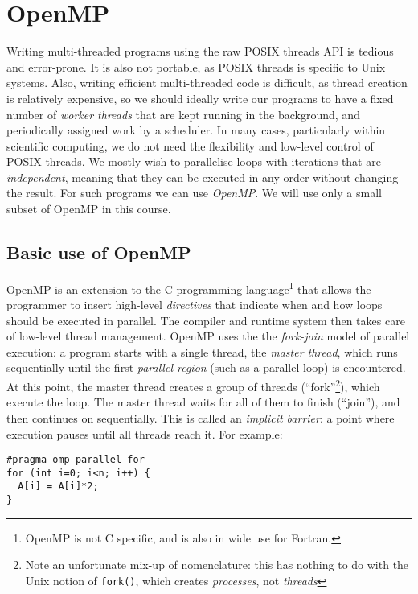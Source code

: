 \lstset{language=C}

\chapter{OpenMP}
\label{chap:openmp}

Writing multi-threaded programs using the raw POSIX threads API is
tedious and error-prone.  It is also not portable, as POSIX threads is
specific to Unix systems.  Also, writing efficient multi-threaded code
is difficult, as thread creation is relatively expensive, so we should
ideally write our programs to have a fixed number of \emph{worker
  threads} that are kept running in the background, and periodically
assigned work by a scheduler.  In many cases, particularly within
scientific computing, we do not need the flexibility and low-level
control of POSIX threads.  We mostly wish to parallelise loops with
iterations that are \emph{independent}, meaning that they can be
executed in any order without changing the result.  For such programs
we can use \emph{OpenMP}.  We will use only a small subset of OpenMP
in this course.

\section{Basic use of OpenMP}

OpenMP is an extension to the C programming language\footnote{OpenMP
  is not C specific, and is also in wide use for Fortran.} that allows
the programmer to insert high-level \emph{directives} that indicate
when and how loops should be executed in parallel.  The compiler and
runtime system then takes care of low-level thread management.  OpenMP
uses the the \emph{fork-join} model of parallel execution: a program
starts with a single thread, the \emph{master thread}, which runs
sequentially until the first \emph{parallel region} (such as a
parallel loop) is encountered.  At this point, the master thread
creates a group of threads (``fork''\footnote{Note an unfortunate
  mix-up of nomenclature: this has nothing to do with the Unix notion
  of \texttt{fork()}, which creates \emph{processes}, not
  \emph{threads}}), which execute the loop.  The master thread waits
for all of them to finish (``join''), and then continues on
sequentially.  This is called an \textit{implicit barrier}: a point
where execution pauses until all threads reach it.  For example:

\begin{lstlisting}[mathescape=true]
#pragma omp parallel for
for (int i=0; i<n; i++) {
  A[i] = A[i]*2;
}
\end{lstlisting}

